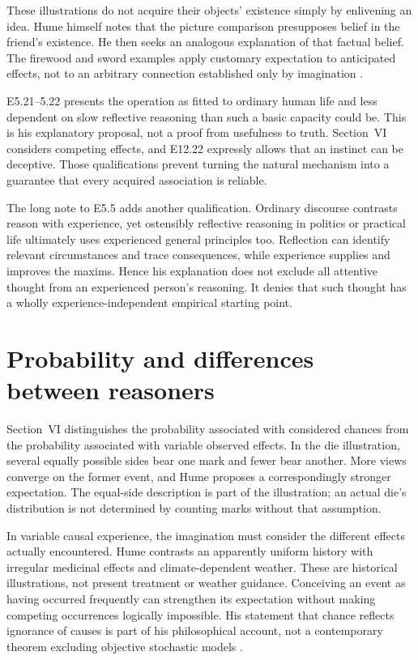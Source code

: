 These illustrations do not acquire their objects' existence simply
by enlivening an idea. Hume himself notes that the picture comparison
presupposes belief in the friend's existence. He then seeks an
analogous explanation of that factual belief. The firewood and sword
examples apply customary expectation to anticipated effects, not to
an arbitrary connection established only by imagination
\parencite[E~5.14--5.20]{Hume1777EnquiryHTO}.

E5.21--5.22 presents the operation as fitted to ordinary human life and
less dependent on slow reflective reasoning than such a basic capacity
could be. This is his explanatory proposal, not a proof from usefulness
to truth. Section~VI considers competing effects, and E12.22 expressly
allows that an instinct can be deceptive. Those qualifications prevent
turning the natural mechanism into a guarantee that every acquired
association is reliable.

The long note to E5.5 adds another qualification. Ordinary discourse
contrasts reason with experience, yet ostensibly reflective reasoning
in politics or practical life ultimately uses experienced general
principles too. Reflection can identify relevant circumstances and
trace consequences, while experience supplies and improves the maxims.
Hence his explanation does not exclude all attentive thought from an
experienced person's reasoning. It denies that such thought has a
wholly experience-independent empirical starting point.

\section{Probability and differences between reasoners}
\label{sec:p15-hume-probability}

Section~VI distinguishes the probability associated with considered
chances from the probability associated with variable observed effects.
In the die illustration, several equally possible sides bear one mark
and fewer bear another. More views converge on the former event, and
Hume proposes a correspondingly stronger expectation. The equal-side
description is part of the illustration; an actual die's distribution
is not determined by counting marks without that assumption.

In variable causal experience, the imagination must consider the
different effects actually encountered. Hume contrasts an apparently
uniform history with irregular medicinal effects and climate-dependent
weather. These are historical illustrations, not present treatment or
weather guidance. Conceiving an event as having occurred frequently
can strengthen its expectation without making competing occurrences
logically impossible. His statement that chance reflects ignorance of
causes is part of his philosophical account, not a contemporary theorem
excluding objective stochastic models
\parencite[E~6.1--6.4, 6.0n10]{Hume1777EnquiryHTO}.

